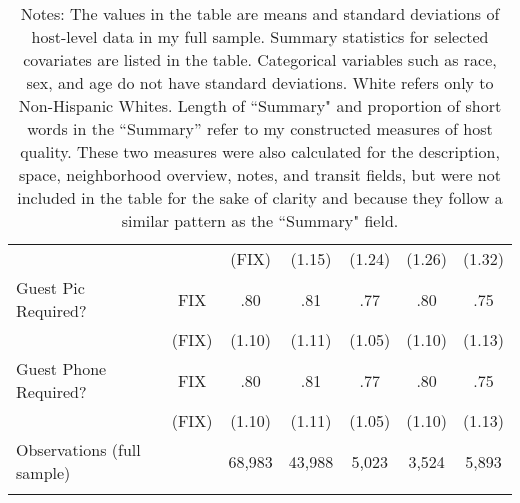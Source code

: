 {\begin{longtable}{l*{6}{c}}
		& &     (FIX)         &     (1.15)         &     (1.24)         &     (1.26)         &		(1.32)\\                    
		[1em]
		Guest Pic Required?   &   FIX  &      .80		&      .81&      .77 &      .80  	& 	.75\\
		&  (FIX)  & (1.10)     &     (1.11)         &     (1.05)         &     (1.10)         &     (1.13)         \\
		Guest Phone Required?   &   FIX  &      .80		&      .81&      .77 &      .80  	& 	.75\\
		&  (FIX)  & (1.10)     &     (1.11)         &     (1.05)         &     (1.10)         &     (1.13)         \\
		
		
		\hline
		Observations (full sample)    &  & 68,983   &       43,988         &       5,023         &       3,524         &       5,893         \\
		\hline\hline
		\caption*{Notes: The values in the table are means and standard deviations of host-level data in my full sample. Summary statistics for selected covariates are listed in the table. Categorical variables such as race, sex, and age do not have standard deviations. White refers only to Non-Hispanic Whites. Length of ``Summary" and proportion of short words in the ``Summary'' refer to my constructed measures of host quality. These two measures were also calculated for the description, space, neighborhood overview, notes, and transit fields, but were not included in the table for the sake of clarity and because they follow a similar pattern as the ``Summary" field.}
		
	\end{longtable}
}

